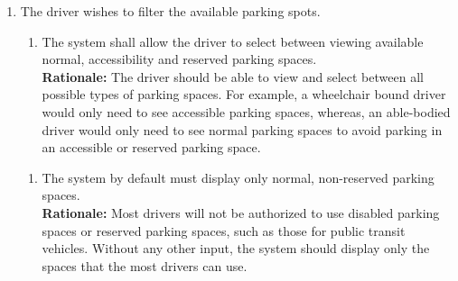 \documentclass[12pt,letterpaper]{article}
\newcounter{businesseventnum}
\newcounter{funcreqnum}
\begin{document}
\begin{enumerate}[{BE}\thebusinesseventnum.] 
\item The driver wishes to filter the available parking spots.
\begin{enumerate}[{FR}\thefuncreqnum.] 
    \item The system shall allow the driver to select between viewing available normal, accessibility and reserved parking spaces.\\
    \textbf{Rationale:} The driver should be able to view and select between all possible types of parking spaces. For example, a wheelchair bound driver would only need to see accessible parking spaces, whereas, an able-bodied driver would only need to see normal parking spaces to avoid parking in an accessible or reserved parking space.
\end{enumerate}
\begin{enumerate}[{FR}\thefuncreqnum.] 
    \item The system by default must display only normal, non-reserved parking spaces.\\
    \textbf{Rationale:} Most drivers will not be authorized to use disabled parking spaces or reserved parking spaces, such as those for public transit vehicles. Without any other input, the system should display only the spaces that the most drivers can use.
\end{enumerate}
\end{enumerate}
\end{document}
